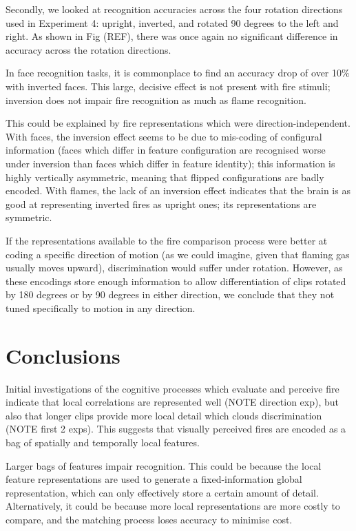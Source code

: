 \documentclass{jov}
\begin{document}
Secondly, we looked at recognition accuracies across the four rotation directions used in Experiment 4: upright, inverted, and rotated 90 degrees to the left and right. As shown in Fig (REF), there was once again no significant difference in accuracy across the rotation directions. 

In face recognition tasks, it is commonplace to find an accuracy drop of over 10\% with inverted faces\cite{freire2000face,yovel2005neural}. This large, decisive effect is not present with fire stimuli; inversion does not impair fire recognition as much as flame recognition.

This could be explained by fire representations which were direction-independent. With faces, the inversion effect seems to be due to mis-coding of configural information (faces which differ in feature configuration are recognised worse under inversion than faces which differ in feature identity\cite{freire2000face}); this information is highly vertically asymmetric, meaning that flipped configurations are badly encoded. With flames, the lack of an inversion effect indicates that the brain is as good at representing inverted fires as upright ones; its representations are symmetric. 

If the representations available to the fire comparison process were better at coding a specific direction of motion (as we could imagine, given that flaming gas usually moves upward), discrimination would suffer under rotation. However, as these encodings store enough information to allow differentiation of clips rotated by 180 degrees or by 90 degrees in either direction, we conclude that they not tuned specifically to motion in any direction.



\section{Conclusions}

Initial investigations of the cognitive processes which evaluate and perceive fire indicate that local correlations are represented well (NOTE direction exp), but also that longer clips provide more local detail which clouds discrimination (NOTE first 2 exps). This suggests that visually perceived fires are encoded as a bag of spatially and temporally local features.

Larger bags of features impair recognition. This could be because the local feature representations are used to generate a fixed-information global representation, which can only effectively store a certain amount of detail. Alternatively, it could be because more local representations are more costly to compare, and the matching process loses accuracy to minimise cost.
\end{document}
